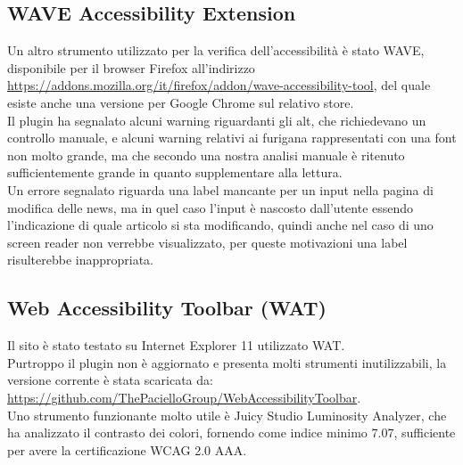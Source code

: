 \documentclass[openany, a4paper, 12pt]{report}
\begin{document}
			\subsection{WAVE Accessibility Extension}
				Un altro strumento utilizzato per la verifica dell'accessibilità è stato WAVE, disponibile per il browser Firefox all'indirizzo \url{https://addons.mozilla.org/it/firefox/addon/wave-accessibility-tool}, del quale esiste anche una versione per Google Chrome sul relativo store.\\
				Il plugin ha segnalato alcuni warning riguardanti gli alt, che richiedevano un controllo manuale, e alcuni warning relativi ai furigana rappresentati con una font non molto grande, ma che secondo una nostra analisi manuale è ritenuto sufficientemente grande in quanto supplementare alla lettura.\\
				Un errore segnalato riguarda una label mancante per un input nella pagina di modifica delle news, ma in quel caso l'input è nascosto dall'utente essendo l'indicazione di quale articolo si sta modificando, quindi anche nel caso di uno screen reader non verrebbe visualizzato, per queste motivazioni una label risulterebbe inappropriata.
			\subsection{Web Accessibility Toolbar (WAT)}
				Il sito è stato testato su Internet Explorer 11 utilizzato WAT.\\
				Purtroppo il plugin non è aggiornato e presenta molti strumenti inutilizzabili, la versione corrente è stata scaricata da:\\ \url{https://github.com/ThePacielloGroup/WebAccessibilityToolbar}.\\
				Uno strumento funzionante molto utile è Juicy Studio Luminosity Analyzer, che ha analizzato il contrasto dei colori, fornendo come indice minimo 7.07, sufficiente per avere la certificazione WCAG 2.0 AAA.\\
\end{document}
